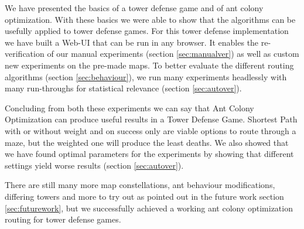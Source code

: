 We have presented the basics of a tower defense game and of ant colony optimization. With these basics we were able to show that the algorithms can be usefully applied to tower defense games.
For this tower defense implementation we have built a Web-UI that can be run in any browser. It enables the re-verification of our manual experiments (section \ref{sec:manualver}) as well as custom new experiments on the pre-made maps.
To better evaluate the different routing algorithms (section \ref{sec:behaviour}), we run many experiments headlessly with many run-throughs for statistical relevance (section \ref{sec:autover}).

Concluding from both these experiments we can say that Ant Colony Optimization can produce useful results in a Tower Defense Game. Shortest Path with or without weight and on success only are viable options to route through a maze, but the weighted one will produce the least deaths. We also showed that we have found optimal parameters for the experiments by showing that different settings yield worse results (section \ref{sec:autover}).

There are still many more map constellations, ant behaviour modifications, differing towers and more to try out as pointed out in the future work section \ref{sec:futurework}, but we successfully achieved a working ant colony optimization routing for tower defense games.